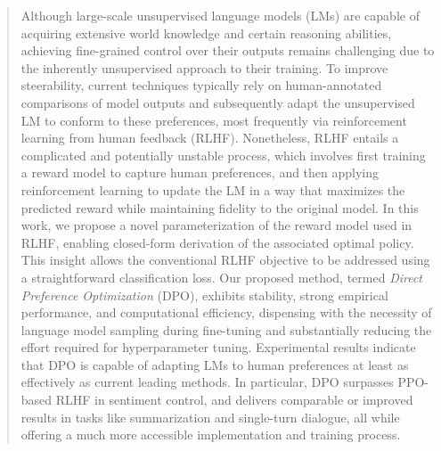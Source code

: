\begin{abstract}
Although large-scale unsupervised language models (LMs) are capable of acquiring extensive world knowledge and certain reasoning abilities, achieving fine-grained control over their outputs remains challenging due to the inherently unsupervised approach to their training. To improve steerability, current techniques typically rely on human-annotated comparisons of model outputs and subsequently adapt the unsupervised LM to conform to these preferences, most frequently via reinforcement learning from human feedback (RLHF). Nonetheless, RLHF entails a complicated and potentially unstable process, which involves first training a reward model to capture human preferences, and then applying reinforcement learning to update the LM in a way that maximizes the predicted reward while maintaining fidelity to the original model. In this work, we propose a novel parameterization of the reward model used in RLHF, enabling closed-form derivation of the associated optimal policy. This insight allows the conventional RLHF objective to be addressed using a straightforward classification loss. Our proposed method, termed \textit{Direct Preference Optimization} (DPO), exhibits stability, strong empirical performance, and computational efficiency, dispensing with the necessity of language model sampling during fine-tuning and substantially reducing the effort required for hyperparameter tuning. Experimental results indicate that DPO is capable of adapting LMs to human preferences at least as effectively as current leading methods. In particular, DPO surpasses PPO-based RLHF in sentiment control, and delivers comparable or improved results in tasks like summarization and single-turn dialogue, all while offering a much more accessible implementation and training process.
\end{abstract}

